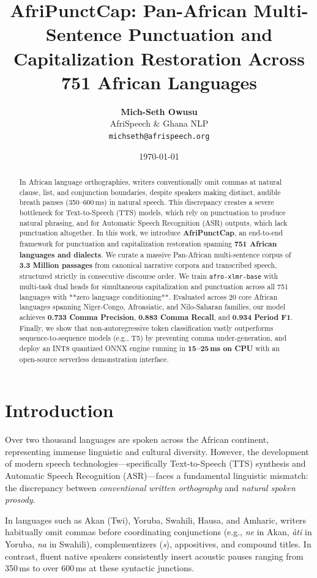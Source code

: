 \documentclass[11pt,a4paper]{article}
\title{\textbf{AfriPunctCap: Pan-African Multi-Sentence Punctuation and Capitalization Restoration Across 751 African Languages}}
\author{
  \textbf{Mich-Seth Owusu}\\
  AfriSpeech \& Ghana NLP\\
  \texttt{michseth@afrispeech.org}
}
\date{\today}
\begin{document}
\maketitle

\begin{abstract}
In African language orthographies, writers conventionally omit commas at natural clause, list, and conjunction boundaries, despite speakers making distinct, audible breath pauses (350--600\,ms) in natural speech. This discrepancy creates a severe bottleneck for Text-to-Speech (TTS) models, which rely on punctuation to produce natural phrasing, and for Automatic Speech Recognition (ASR) outputs, which lack punctuation altogether. In this work, we introduce \textbf{AfriPunctCap}, an end-to-end framework for punctuation and capitalization restoration spanning \textbf{751 African languages and dialects}. We curate a massive Pan-African multi-sentence corpus of \textbf{3.3 Million passages} from canonical narrative corpora and transcribed speech, structured strictly in consecutive discourse order. We train \texttt{afro-xlmr-base} with multi-task dual heads for simultaneous capitalization and punctuation across all 751 languages with **zero language conditioning**. Evaluated across 20 core African languages spanning Niger-Congo, Afroasiatic, and Nilo-Saharan families, our model achieves \textbf{0.733 Comma Precision}, \textbf{0.883 Comma Recall}, and \textbf{0.934 Period F1}. Finally, we show that non-autoregressive token classification vastly outperforms sequence-to-sequence models (e.g., T5) by preventing comma under-generation, and deploy an INT8 quantized ONNX engine running in \textbf{15--25\,ms on CPU} with an open-source serverless demonstration interface.
\end{abstract}

\section{Introduction}

Over two thousand languages are spoken across the African continent, representing immense linguistic and cultural diversity. However, the development of modern speech technologies---specifically Text-to-Speech (TTS) synthesis and Automatic Speech Recognition (ASR)---faces a fundamental linguistic mismatch: the discrepancy between \textit{conventional written orthography} and \textit{natural spoken prosody}.

In languages such as Akan (Twi), Yoruba, Swahili, Hausa, and Amharic, writers habitually omit commas before coordinating conjunctions (e.g., \textit{ne} in Akan, \textit{\`{a}ti} in Yoruba, \textit{na} in Swahili), complementizers (\textit{s\textepsilon}), appositives, and compound titles. In contrast, fluent native speakers consistently insert acoustic pauses ranging from 350\,ms to over 600\,ms at these syntactic junctions.
\end{document}
